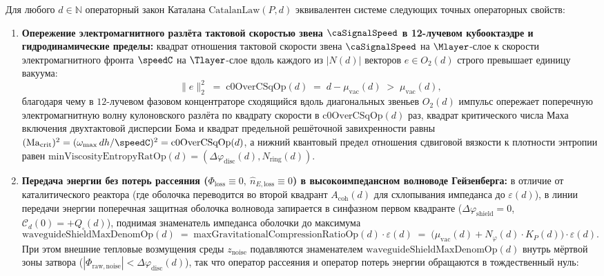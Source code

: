 \begin{theorem}
\label{thm:applied-c0-and-lossless-waveguide}
Для любого $d\in\mathbb{N}$ операторный закон Каталана $\mathrm{CatalanLaw}(P,d)$ эквивалентен системе следующих точных операторных свойств:
\begin{enumerate}[label=\textbf{(\roman*)},leftmargin=*]
\item \textbf{Опережение электромагнитного разлёта тактовой скоростью звена $\caSignalSpeed$ в 12-лучевом кубооктаэдре и гидродинамические пределы:}
  квадрат отношения тактовой скорости звена $\caSignalSpeed$ на $\Mlayer$-слое к скорости электромагнитного фронта $\speedC$ на $\Tlayer$-слое вдоль каждого из $|N(d)|$ векторов $e\in O_2(d)$ строго превышает единицу вакуума:
  \[
    \|e\|_2^2 \;=\; \mathrm{c0OverCSqOp}(d) \;=\; d - \mu_{\mathrm{vac}}(d) \;>\; \mu_{\mathrm{vac}}(d),
  \]
  благодаря чему в $12$-лучевом фазовом концентраторе сходящийся вдоль диагональных звеньев $O_2(d)$ импульс опережает поперечную электромагнитную волну кулоновского разлёта по квадрату скорости в $\mathrm{c0OverCSqOp}(d)$ раз, квадрат критического числа Маха включения двухтактовой дисперсии Бома и квадрат предельной решёточной завихренности равны $(\mathrm{Ma}_{\mathrm{crit}})^2 = (\omega_{\max}\,dh/\speedC)^2 = \mathrm{c0OverCSqOp}(d)$, а нижний квантовый предел отношения сдвиговой вязкости к плотности энтропии равен $\mathrm{minViscosityEntropyRatOp}(d) = (\Delta\varphi_{\mathrm{disc}}(d),N_{\mathrm{ring}}(d))$.
\item \textbf{Передача энергии без потерь рассеяния ($\Phi_{\mathrm{loss}}\equiv 0,\ \widehat{n}_{E,\mathrm{loss}}\equiv 0$) в высокоимпедансном волноводе Гейзенберга:}
  в отличие от каталитического реактора (где оболочка переводится во второй квадрант $A_{\mathrm{coh}}(d)$ для схлопывания импеданса до $\varepsilon(d)$), в линии передачи энергии поперечная защитная оболочка волновода запирается в синфазном первом квадранте ($\Delta\varphi_{\mathrm{shield}}=0$, $\mathcal{C}_d(0)=+Q_\square(d)$), поднимая знаменатель импеданса оболочки до максимума
  \[
    \mathrm{waveguideShieldMaxDenomOp}(d) \;=\; \mathrm{maxGravitationalCompressionRatioOp}(d)\cdot\varepsilon(d) \;=\; \bigl(\mu_{\mathrm{vac}}(d) + N_\varphi(d)\cdot K_P(d)\bigr)\cdot\varepsilon(d).
  \]
  При этом внешние тепловые возмущения среды $z_{\mathrm{noise}}$ подавляются знаменателем $\mathrm{waveguideShieldMaxDenomOp}(d)$ внутрь мёртвой зоны затвора ($|\Phi_{\mathrm{raw,noise}}| < \Delta\varphi_{\mathrm{disc}}(d)$), так что оператор рассеяния и оператор потерь энергии обращаются в тождественный нуль:

\end{enumerate}
\end{theorem}
